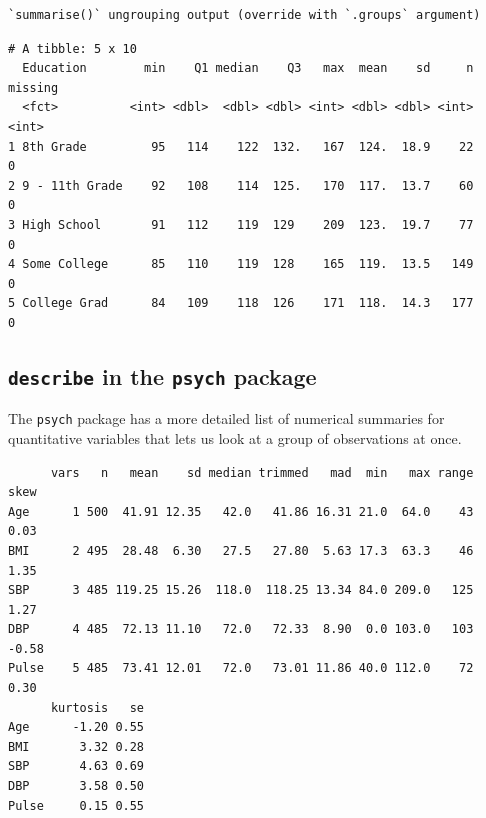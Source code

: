 \documentclass[
]{book}
\newenvironment{Shaded}{\begin{snugshade}}{\end{snugshade}}
\newcommand{\KeywordTok}[1]{\textcolor[rgb]{0.13,0.29,0.53}{\textbf{#1}}}
\newcommand{\NormalTok}[1]{#1}
\newcommand{\OperatorTok}[1]{\textcolor[rgb]{0.81,0.36,0.00}{\textbf{#1}}}
\newcommand{\StringTok}[1]{\textcolor[rgb]{0.31,0.60,0.02}{#1}}
\begin{document}
\begin{verbatim}
`summarise()` ungrouping output (override with `.groups` argument)
\end{verbatim}

\begin{verbatim}
# A tibble: 5 x 10
  Education        min    Q1 median    Q3   max  mean    sd     n missing
  <fct>          <int> <dbl>  <dbl> <dbl> <int> <dbl> <dbl> <int>   <int>
1 8th Grade         95   114    122  132.   167  124.  18.9    22       0
2 9 - 11th Grade    92   108    114  125.   170  117.  13.7    60       0
3 High School       91   112    119  129    209  123.  19.7    77       0
4 Some College      85   110    119  128    165  119.  13.5   149       0
5 College Grad      84   109    118  126    171  118.  14.3   177       0
\end{verbatim}

\hypertarget{describe-in-the-psych-package}{%
\subsection{\texorpdfstring{\texttt{describe} in the \texttt{psych} package}{describe in the psych package}}\label{describe-in-the-psych-package}}

The \texttt{psych} package has a more detailed list of numerical summaries for quantitative variables that lets us look at a group of observations at once.

\begin{Shaded}
\end{Shaded}

\begin{verbatim}
      vars   n   mean    sd median trimmed   mad  min   max range  skew
Age      1 500  41.91 12.35   42.0   41.86 16.31 21.0  64.0    43  0.03
BMI      2 495  28.48  6.30   27.5   27.80  5.63 17.3  63.3    46  1.35
SBP      3 485 119.25 15.26  118.0  118.25 13.34 84.0 209.0   125  1.27
DBP      4 485  72.13 11.10   72.0   72.33  8.90  0.0 103.0   103 -0.58
Pulse    5 485  73.41 12.01   72.0   73.01 11.86 40.0 112.0    72  0.30
      kurtosis   se
Age      -1.20 0.55
BMI       3.32 0.28
SBP       4.63 0.69
DBP       3.58 0.50
Pulse     0.15 0.55
\end{verbatim}
\end{document}
